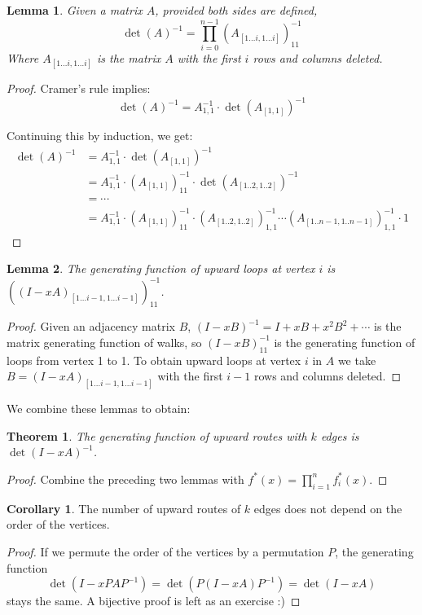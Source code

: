 \documentclass[a4paper, 11pt]{article}
\newtheorem{theorem}{Theorem}[section]
\newtheorem{lemma}{Lemma}[section]
\theoremstyle{definition}
\newtheorem{corollary}{Corollary}[theorem]
\begin{document}
\begin{lemma} Given a matrix $A$, provided both sides are defined,
  \[ \det(A)^{-1} = \prod_{i=0}^{n-1} (A_{[1\dots i, 1\dots i]})^{-1}_{11} \]
Where $A_{[1\dots i, 1\dots i]}$ is the matrix $A$ with the first $i$ rows and columns deleted.
\end{lemma}
\begin{proof}
  Cramer's rule implies:
\[
  \det(A)^{-1} = A^{-1}_{1,1} \cdot \det(A_{[1,1]})^{-1}
\]

Continuing this by induction, we get:
\begin{align*}
  \det(A)^{-1} &= A^{-1}_{1,1} \cdot \det(A_{[1,1]})^{-1} \\
    &= A^{-1}_{1,1} \cdot (A_{[1,1]})^{-1}_{11} \cdot \det(A_{[1..2,1..2]})^{-1} \\
    &= \cdots \\
    &= A^{-1}_{1,1} \cdot (A_{[1,1]})^{-1}_{11} \cdot (A_{[1..2,1..2]})^{-1}_{1,1} \cdots
        (A_{[1..n-1,1..n-1]})^{-1}_{1,1} \cdot 1
\end{align*}
\end{proof}

\begin{lemma}
  The generating function of upward loops at vertex $i$ is $((I - xA)_{[1\dots i-1, 1\dots i-1]})^{-1}_{11}$.
\end{lemma}
\begin{proof}
  Given an adjacency matrix $B$, $(I - xB)^{-1} = I + xB + x^2 B^2 + \cdots$ is the matrix generating function of walks, so $(I - xB)^{-1}_{11}$ is the generating function of loops from vertex 1 to 1. To obtain upward loops at vertex $i$ in $A$ we take $B = (I - xA)_{[1\dots i-1, 1\dots i-1]}$ with the first $i-1$ rows and columns deleted.
\end{proof}

We combine these lemmas to obtain:

\begin{theorem}
  The generating function of upward routes with $k$ edges is $\det(I - xA)^{-1}$.
\end{theorem}
\begin{proof}
  Combine the preceding two lemmas with $f^{*}(x) = \prod_{i=1}^n f^{*}_i(x)$.
\end{proof}

\begin{corollary}
  The number of upward routes of $k$ edges does not depend on the order of the vertices.
\end{corollary}
\begin{proof}
  If we permute the order of the vertices by a permutation $P$, the generating function
  \[
    \det(I - xPAP^{-1}) = \det(P(I - xA)P^{-1}) = \det(I - xA)
  \] stays the same. A bijective proof is left as an exercise :)
\end{proof}
\end{document}
